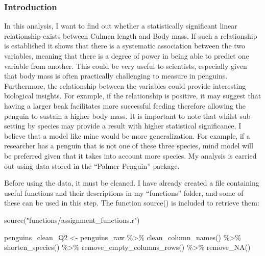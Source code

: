 \documentclass[
]{article}
\newenvironment{Shaded}{\begin{snugshade}}{\end{snugshade}}
\newcommand{\FunctionTok}[1]{\textcolor[rgb]{0.00,0.00,0.00}{#1}}
\newcommand{\NormalTok}[1]{#1}
\newcommand{\OtherTok}[1]{\textcolor[rgb]{0.56,0.35,0.01}{#1}}
\newcommand{\SpecialCharTok}[1]{\textcolor[rgb]{0.00,0.00,0.00}{#1}}
\newcommand{\StringTok}[1]{\textcolor[rgb]{0.31,0.60,0.02}{#1}}
\begin{document}
\hypertarget{introduction}{%
\subsubsection{Introduction}\label{introduction}}

In this analysis, I want to find out whether a statistically significant
linear relationship exists between Culmen length and Body mass. If such
a relationship is established it shows that there is a systematic
association between the two variables, meaning that there is a degree of
power in being able to predict one variable from another. This could be
very useful to scientists, especially given that body mass is often
practically challenging to measure in penguins. Furthermore, the
relationship between the variables could provide interesting biological
insights. For example, if the relationship is positive, it may suggest
that having a larger beak facilitates more successful feeding therefore
allowing the penguin to sustain a higher body mass. It is important to
note that whilst sub-setting by species may provide a result with higher
statistical significance, I believe that a model like mine would be more
generalization. For example, if a researcher has a penguin that is not
one of these three species, mind model will be preferred given that it
takes into account more species. My analysis is carried out using data
stored in the ``Palmer Penguin'' package.

Before using the data, it must be cleaned. I have already created a file
containing useful functions and their descriptions in my ``functions''
folder, and some of these can be used in this step. The function
source() is included to retrieve them:

\begin{Shaded}
\begin{Highlighting}[]
\FunctionTok{source}\NormalTok{(}\StringTok{"functions/assignment\_functions.r"}\NormalTok{)}

\NormalTok{penguins\_clean\_Q2 }\OtherTok{\textless{}{-}}\NormalTok{ penguins\_raw  }\SpecialCharTok{\%\textgreater{}\%}
    \FunctionTok{clean\_column\_names}\NormalTok{() }\SpecialCharTok{\%\textgreater{}\%}
    \FunctionTok{shorten\_species}\NormalTok{() }\SpecialCharTok{\%\textgreater{}\%}
    \FunctionTok{remove\_empty\_columns\_rows}\NormalTok{() }\SpecialCharTok{\%\textgreater{}\%}
   \FunctionTok{remove\_NA}\NormalTok{()}
\end{Highlighting}
\end{Shaded}
\end{document}
